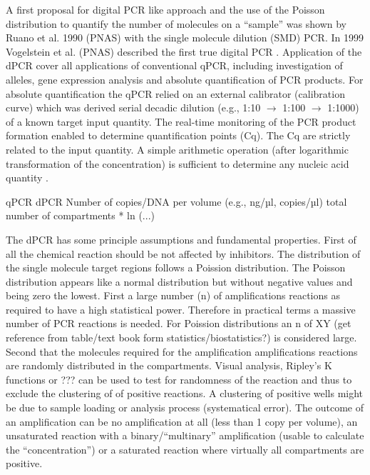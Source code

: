 \documentclass{bioinfo}
\begin{document}
A first proposal for digital PCR like approach and the use of the Poisson 
distribution to quantify the number of molecules on a ``sample'' was shown by 
Ruano et al. 1990 (PNAS) with the single molecule dilution (SMD) PCR. In 1999 
Vogelstein et al. (PNAS) described the first true digital PCR \cite{morley_digital_2014}. Application of 
the dPCR cover all applications of conventional qPCR, including investigation of 
alleles, gene expression analysis and absolute quantification of PCR products. 
For absolute quantification the qPCR relied on an external calibrator 
(calibration curve) which was derived serial decadic dilution (e.g., 1:10 $\rightarrow$ 
1:100 $\rightarrow$ 1:1000) of a known target input quantity. The real-time monitoring of 
the PCR product formation enabled to determine quantification points (Cq). The 
Cq are strictly related to the input quantity. A simple arithmetic operation 
(after logarithmic transformation of the concentration) is sufficient to 
determine any nucleic acid quantity \cite{huggett_considerations_2014}.

qPCR	dPCR
Number of copies/DNA per volume (e.g., ng/µl, copies/µl)	total number of compartments * ln (...)

The dPCR has some principle assumptions and fundamental properties. First of all 
the chemical reaction should be not affected by inhibitors. The distribution of 
the single molecule target regions follows a Poission distribution. The Poisson 
distribution appears like a normal distribution but without negative values and 
being zero the lowest. First a large number (n) of amplifications reactions as 
required to have a high statistical power. Therefore in practical terms a 
massive number of PCR reactions is needed. For Poission distributions an n of XY 
(get reference from table/text book form statistics/biostatistics?) is 
considered large. Second that the molecules required for the amplification 
amplifications reactions are randomly distributed in the compartments. Visual 
analysis, Ripley's K functions or ??? can be used to test for randomness of the 
reaction and thus to exclude the clustering of of positive reactions. A 
clustering of positive wells might be due to sample loading or analysis process 
(systematical error). The outcome of an amplification can be no amplification at 
all (less than 1 copy per volume), an unsaturated reaction with a 
binary/``multinary'' amplification (usable to calculate the ``concentration'') 
or a saturated reaction where virtually all compartments are positive.
\end{document}
